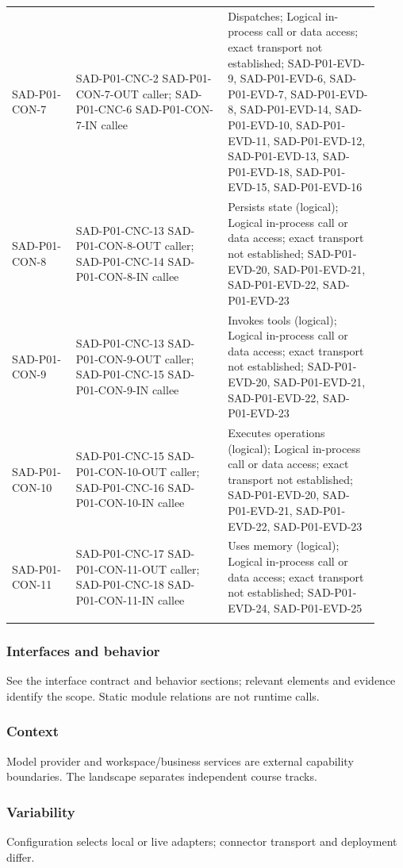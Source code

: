 \documentclass[10pt,letterpaper]{article}
\begin{document}
\begin{longtable}{@{}>{\raggedright\arraybackslash}p{0.16\linewidth}>{\raggedright\arraybackslash}p{0.38\linewidth}>{\raggedright\arraybackslash}p{0.38\linewidth}@{}}
SAD-P01-CON-7 & SAD-P01-CNC-2 SAD-P01-CON-7-OUT caller; SAD-P01-CNC-6 SAD-P01-CON-7-IN callee & Dispatches; Logical in-process call or data access; exact transport not established; SAD-P01-EVD-9, SAD-P01-EVD-6, SAD-P01-EVD-7, SAD-P01-EVD-8, SAD-P01-EVD-14, SAD-P01-EVD-10, SAD-P01-EVD-11, SAD-P01-EVD-12, SAD-P01-EVD-13, SAD-P01-EVD-18, SAD-P01-EVD-15, SAD-P01-EVD-16\\\addlinespace
SAD-P01-CON-8 & SAD-P01-CNC-13 SAD-P01-CON-8-OUT caller; SAD-P01-CNC-14 SAD-P01-CON-8-IN callee & Persists state (logical); Logical in-process call or data access; exact transport not established; SAD-P01-EVD-20, SAD-P01-EVD-21, SAD-P01-EVD-22, SAD-P01-EVD-23\\\addlinespace
SAD-P01-CON-9 & SAD-P01-CNC-13 SAD-P01-CON-9-OUT caller; SAD-P01-CNC-15 SAD-P01-CON-9-IN callee & Invokes tools (logical); Logical in-process call or data access; exact transport not established; SAD-P01-EVD-20, SAD-P01-EVD-21, SAD-P01-EVD-22, SAD-P01-EVD-23\\\addlinespace
SAD-P01-CON-10 & SAD-P01-CNC-15 SAD-P01-CON-10-OUT caller; SAD-P01-CNC-16 SAD-P01-CON-10-IN callee & Executes operations (logical); Logical in-process call or data access; exact transport not established; SAD-P01-EVD-20, SAD-P01-EVD-21, SAD-P01-EVD-22, SAD-P01-EVD-23\\\addlinespace
SAD-P01-CON-11 & SAD-P01-CNC-17 SAD-P01-CON-11-OUT caller; SAD-P01-CNC-18 SAD-P01-CON-11-IN callee & Uses memory (logical); Logical in-process call or data access; exact transport not established; SAD-P01-EVD-24, SAD-P01-EVD-25\\\addlinespace
\bottomrule\end{longtable}

\subsubsection{Interfaces and behavior}
See the interface contract and behavior sections; relevant elements and evidence identify the scope. Static module relations are not runtime calls.
\subsubsection{Context}
Model provider and workspace/business services are external capability boundaries. The landscape separates independent course tracks.
\subsubsection{Variability}
Configuration selects local or live adapters; connector transport and deployment differ.
\end{document}
